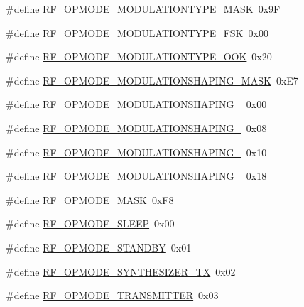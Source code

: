\begin{DoxyCompactItemize}
\item 
\#define \hyperlink{sx1276Regs-Fsk_8h_a9b3d405d931ad505308b89d2fa029dbb}{R\+F\+\_\+\+O\+P\+M\+O\+D\+E\+\_\+\+M\+O\+D\+U\+L\+A\+T\+I\+O\+N\+T\+Y\+P\+E\+\_\+\+M\+A\+SK}~0x9F
\item 
\#define \hyperlink{sx1276Regs-Fsk_8h_af4f3f4b19fd43491f270fcee634edd13}{R\+F\+\_\+\+O\+P\+M\+O\+D\+E\+\_\+\+M\+O\+D\+U\+L\+A\+T\+I\+O\+N\+T\+Y\+P\+E\+\_\+\+F\+SK}~0x00
\item 
\#define \hyperlink{sx1276Regs-Fsk_8h_af6fe2f62d8ec55fcf40c73ae24bc54ae}{R\+F\+\_\+\+O\+P\+M\+O\+D\+E\+\_\+\+M\+O\+D\+U\+L\+A\+T\+I\+O\+N\+T\+Y\+P\+E\+\_\+\+O\+OK}~0x20
\item 
\#define \hyperlink{sx1276Regs-Fsk_8h_a1b851bfa8cc641cd5a2a0805df4f4762}{R\+F\+\_\+\+O\+P\+M\+O\+D\+E\+\_\+\+M\+O\+D\+U\+L\+A\+T\+I\+O\+N\+S\+H\+A\+P\+I\+N\+G\+\_\+\+M\+A\+SK}~0x\+E7
\item 
\#define \hyperlink{sx1276Regs-Fsk_8h_a1a589ce58d8c5fb2da244d4829d11a3f}{R\+F\+\_\+\+O\+P\+M\+O\+D\+E\+\_\+\+M\+O\+D\+U\+L\+A\+T\+I\+O\+N\+S\+H\+A\+P\+I\+N\+G\+\_}~0x00
\item 
\#define \hyperlink{sx1276Regs-Fsk_8h_a19fca1c14eed0e9a8879aaef7a27e05f}{R\+F\+\_\+\+O\+P\+M\+O\+D\+E\+\_\+\+M\+O\+D\+U\+L\+A\+T\+I\+O\+N\+S\+H\+A\+P\+I\+N\+G\+\_}~0x08
\item 
\#define \hyperlink{sx1276Regs-Fsk_8h_a07bd0112f429ed1340afabbb6d511da3}{R\+F\+\_\+\+O\+P\+M\+O\+D\+E\+\_\+\+M\+O\+D\+U\+L\+A\+T\+I\+O\+N\+S\+H\+A\+P\+I\+N\+G\+\_}~0x10
\item 
\#define \hyperlink{sx1276Regs-Fsk_8h_a9f1f93b87462b90bcbccba6a26400c89}{R\+F\+\_\+\+O\+P\+M\+O\+D\+E\+\_\+\+M\+O\+D\+U\+L\+A\+T\+I\+O\+N\+S\+H\+A\+P\+I\+N\+G\+\_}~0x18
\item 
\#define \hyperlink{sx1276Regs-Fsk_8h_a85461827ea27e5138c9198c75f1bdf6e}{R\+F\+\_\+\+O\+P\+M\+O\+D\+E\+\_\+\+M\+A\+SK}~0x\+F8
\item 
\#define \hyperlink{sx1276Regs-Fsk_8h_a2b5cd905a9116a8a462c28a2d17c483a}{R\+F\+\_\+\+O\+P\+M\+O\+D\+E\+\_\+\+S\+L\+E\+EP}~0x00
\item 
\#define \hyperlink{sx1276Regs-Fsk_8h_a8061431d06917243c6409c4a014c3592}{R\+F\+\_\+\+O\+P\+M\+O\+D\+E\+\_\+\+S\+T\+A\+N\+D\+BY}~0x01
\item 
\#define \hyperlink{sx1276Regs-Fsk_8h_ab384b4d4a5a2e55a8a6eadf18e00e8db}{R\+F\+\_\+\+O\+P\+M\+O\+D\+E\+\_\+\+S\+Y\+N\+T\+H\+E\+S\+I\+Z\+E\+R\+\_\+\+TX}~0x02
\item 
\#define \hyperlink{sx1276Regs-Fsk_8h_a9851bc9741460e2c48415a59f9e3f5ba}{R\+F\+\_\+\+O\+P\+M\+O\+D\+E\+\_\+\+T\+R\+A\+N\+S\+M\+I\+T\+T\+ER}~0x03

\end{DoxyCompactItemize}
